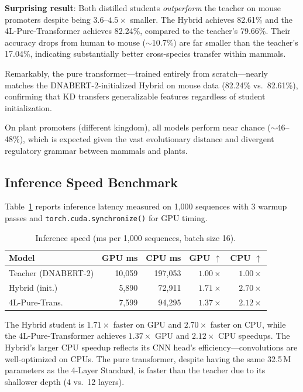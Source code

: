 \documentclass{article}
\begin{document}
\textbf{Surprising result}: Both distilled students \emph{outperform} the teacher on mouse promoters despite being $3.6$--$4.5\times$ smaller. The Hybrid achieves 82.61\% and the 4L-Pure-Transformer achieves 82.24\%, compared to the teacher's 79.66\%. Their accuracy drops from human to mouse ($\sim$10.7\%) are far smaller than the teacher's 17.04\%, indicating substantially better cross-species transfer within mammals.

Remarkably, the pure transformer---trained entirely from scratch---nearly matches the DNABERT-2-initialized Hybrid on mouse data (82.24\% vs.\ 82.61\%), confirming that KD transfers generalizable features regardless of student initialization.

On plant promoters (different kingdom), all models perform near chance ($\sim$46--48\%), which is expected given the vast evolutionary distance and divergent regulatory grammar between mammals and plants.

\subsection{Inference Speed Benchmark}

Table~\ref{tab:speed} reports inference latency measured on 1,000 sequences with 3 warmup passes and \texttt{torch.cuda.synchronize()} for GPU timing.

\begin{table}[t]
\centering
\caption{Inference speed (ms per 1,000 sequences, batch size 16).}
\label{tab:speed}
\begin{tabular}{lrrrr}
\toprule
\textbf{Model} & \textbf{GPU ms} & \textbf{CPU ms} & \textbf{GPU $\uparrow$} & \textbf{CPU $\uparrow$} \\
\midrule
Teacher (DNABERT-2)  & 10,059 & 197,053 & $1.00\times$ & $1.00\times$ \\
Hybrid (init.)   & 5,890  & 72,911  & $1.71\times$ & $\mathbf{2.70\times}$ \\
4L-Pure-Trans.   & 7,599  & 94,295  & $1.37\times$ & $2.12\times$ \\
\bottomrule
\end{tabular}
\end{table}

The Hybrid student is $1.71\times$ faster on GPU and $2.70\times$ faster on CPU, while the 4L-Pure-Transformer achieves $1.37\times$ GPU and $2.12\times$ CPU speedups. The Hybrid's larger CPU speedup reflects its CNN head's efficiency---convolutions are well-optimized on CPUs. The pure transformer, despite having the same 32.5\,M parameters as the 4-Layer Standard, is faster than the teacher due to its shallower depth (4 vs.\ 12 layers).
\end{document}
